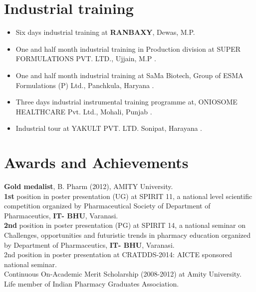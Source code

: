 \documentclass[margin,line]{res}
\begin{document}
\begin{resume}

\section{\sc Industrial training}

\begin{itemize} [leftmargin=.1in]
\setlength\itemsep{-1em}
 
\item Six days industrial training at { \bf RANBAXY}, Dewas, M.P.\\
\item One and half month industrial training in Production division at SUPER FORMULATIONS PVT. LTD., Ujjain, M.P . \\
\item One and half month industrial training at SaMa Biotech, Group of ESMA Formulations (P) Ltd., Panchkula, Haryana .\\
\item Three days industrial instrumental training programme at, ONIOSOME HEALTHCARE Pvt. Ltd., Mohali, Punjab . \\
\item Industrial tour at YAKULT PVT. LTD. Sonipat, Harayana .\\

\end{itemize}



\section{\sc Awards and Achievements}
\setlength{\parskip}{10pt plus 1pt minus 1pt}

{\bf Gold medalist}, B. Pharm (2012), AMITY University.\vspace{1mm}\\
{\bf 1st} position in poster presentation (UG) at SPIRIT 11, a national level scientific competition organized by Pharmaceutical Society of Department of Pharmaceutics, {\bf IT- BHU}, Varanasi.\vspace{1mm}\\
{\bf 2nd} position in poster presentation (PG) at SPIRIT 14, a national seminar on Challenges, opportunities and futuristic trends in pharmacy education organized by Department of Pharmaceutics, {\bf IT- BHU}, Varanasi.\vspace{1mm}\\
2nd position in poster presentation at CRATDDS-2014: AICTE sponsored national seminar.\vspace{1mm}\\
Continuous On-Academic Merit Scholarship (2008-2012) at Amity University.\vspace{1mm}\\
Life member of Indian Pharmacy Graduates Association.\\



\end{resume}
\end{document}
